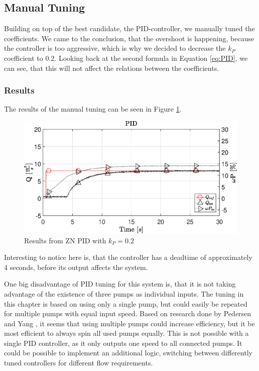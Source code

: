 \subsection{Manual Tuning}\label{sub:manualPID}
Building on top of the best candidate, the PID-controller,
we manually tuned the coefficients.
We came to the conclusion,
that the overshoot is happening, because the controller is too aggressive,
which is why we decided to decrease the $k_P$ coefficient to $0.2$.
Looking back at the second formula in Equation \ref{eq:PID},
we can see, that this will not affect the relations between the coefficients.

\subsubsection{Results}
The results of the manual tuning can be seen in Figure \ref{fig:manualPID}.

\begin{figure}[H]
    \centering
    \includegraphics[width=\textwidth]{figures/07controllerDesign/manualPID.eps}
    \caption{Results from ZN PID with $k_P = 0.2$}
	\label{fig:manualPID}
\end{figure}
Interesting to notice here is,
that the controller has a deadtime of approximately 4 seconds,
before its output affects the system.


One big disadvantage of PID tuning for this system is,
that it is not taking advantage of the existence of three pumps as  individual inputs.
The tuning in this chapter is based on using only a single pump,
but could easily be repeated for multiple pumps with equal input speed.
Based on research done by Pedersen and Yang \cite{YangMultiPump2008},
it seems that using multiple pumps could increase efficiency,
but it be most efficient to always spin all used pumps equally.
This is not possible with a single PID controller,
as it only outputs one speed to all connected pumps.
It could be possible to implement an additional logic,
switching between differently tuned controllers for different flow requirements.
